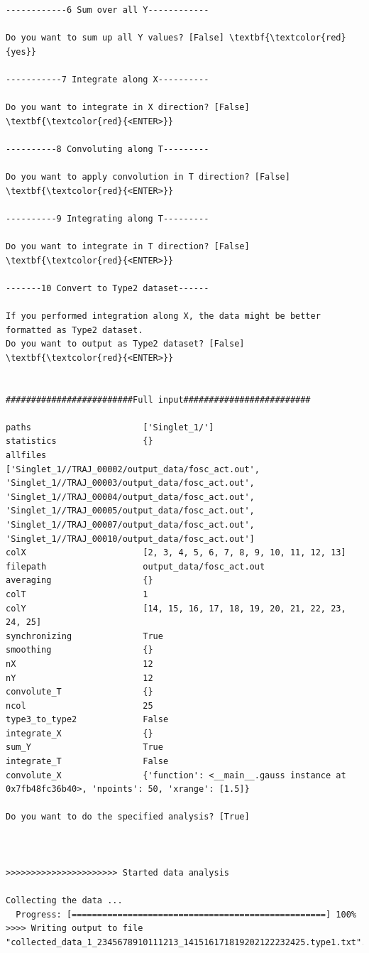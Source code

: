 \documentclass[a4paper,11pt,DIV=15,openany]{scrbook}
\begin{document}
\begin{oframed}
\begin{Verbatim}[commandchars=\\\{\}]
------------6 Sum over all Y------------

Do you want to sum up all Y values? [False] \textbf{\textcolor{red}{yes}}

-----------7 Integrate along X----------

Do you want to integrate in X direction? [False] \textbf{\textcolor{red}{<ENTER>}}

----------8 Convoluting along T---------

Do you want to apply convolution in T direction? [False] \textbf{\textcolor{red}{<ENTER>}}

----------9 Integrating along T---------

Do you want to integrate in T direction? [False] \textbf{\textcolor{red}{<ENTER>}}

-------10 Convert to Type2 dataset------

If you performed integration along X, the data might be better formatted as Type2 dataset.
Do you want to output as Type2 dataset? [False] \textbf{\textcolor{red}{<ENTER>}}


#########################Full input#########################

paths                      ['Singlet_1/']
statistics                 {}
allfiles                   ['Singlet_1//TRAJ_00002/output_data/fosc_act.out', 'Singlet_1//TRAJ_00003/output_data/fosc_act.out', 'Singlet_1//TRAJ_00004/output_data/fosc_act.out', 'Singlet_1//TRAJ_00005/output_data/fosc_act.out', 'Singlet_1//TRAJ_00007/output_data/fosc_act.out', 'Singlet_1//TRAJ_00010/output_data/fosc_act.out']
colX                       [2, 3, 4, 5, 6, 7, 8, 9, 10, 11, 12, 13]
filepath                   output_data/fosc_act.out
averaging                  {}
colT                       1
colY                       [14, 15, 16, 17, 18, 19, 20, 21, 22, 23, 24, 25]
synchronizing              True
smoothing                  {}
nX                         12
nY                         12
convolute_T                {}
ncol                       25
type3_to_type2             False
integrate_X                {}
sum_Y                      True
integrate_T                False
convolute_X                {'function': <__main__.gauss instance at 0x7fb48fc36b40>, 'npoints': 50, 'xrange': [1.5]}

Do you want to do the specified analysis? [True] 



>>>>>>>>>>>>>>>>>>>>>> Started data analysis

Collecting the data ...
  Progress: [==================================================] 100%
>>>> Writing output to file "collected_data_1_2345678910111213_141516171819202122232425.type1.txt"...


\end{Verbatim}
\end{oframed}
\end{document}
